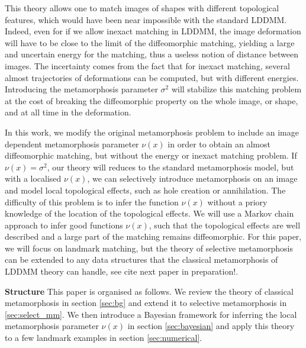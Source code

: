 \documentclass[runningheads]{llncs}
\begin{document}
This theory allows one to match images of shapes with different topological features, which would have been near impossible with the standard LDDMM. 
Indeed, even for if we allow inexact matching in LDDMM, the image deformation will have to be close to the limit of the diffeomorphic matching, yielding a large and uncertain energy for the matching, thus a useless notion of distance between images. 
The incertainty comes from the fact that for inexact matching, several almost trajectories of deformations can be computed, but with different energies.  
Introducing the metamorphosis parameter $\sigma^2$ will stabilize this matching problem at the cost of breaking the diffeomorphic property on the whole image, or shape, and at all time in the deformation. 

In this work, we modify the original metamorphosis problem to include an image dependent metamorphosis parameter $\nu(x)$ in order to obtain an almost diffeomorphic matching, but without the energy or inexact matching problem. 
If $\nu(x) = \sigma^2$, our theory will reduces to the standard metamorphosis model, but with a localised $\nu(x)$, we can selectively introduce metamorphosis on an image and model local topological effects, such as hole creation or annihilation. 
The difficulty of this problem is to infer the function $\nu(x)$ without a priory knowledge of the location of the topological effects. 
We will use a Markov chain approach to infer good functions $\nu(x)$, such that the topological effects are well described and a large part of the matching remains diffeomorphic. 
For this paper, we will focus on landmark matching, but the theory of selective metamorphosis can be extended to any data structures that the classical metamorphosis of LDDMM theory can handle, see {\color{red} cite next paper in preparation!}. 




{\bf Structure} This paper is organised as follows. We review the theory of classical metamorphosis in section
\ref{sec:bg} and extend it to selective metamorphosis in \ref{sec:select_mm}. 
We then introduce a Bayesian framework for inferring the local metamorphosis parameter $\nu(x)$ in section \ref{sec:bayesian} and apply this theory to a few landmark examples in section \ref{sec:numerical}.
\end{document}
